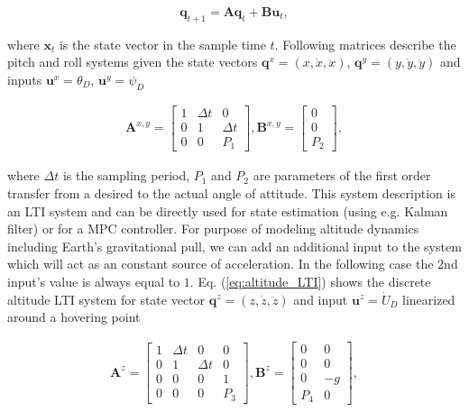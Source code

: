 \begin{equation}
\mathbf{q}_{t+1} = \mathbf{A}\mathbf{q}_{t}+ \mathbf{B}\mathbf{u}_{t},
\end{equation}

where $\mathbf{x}_{t}$ is the state vector in the sample time $t$. Following matrices describe the pitch and roll systems given the state vectors $\mathbf{q}^{x} = \left(x, \dot{x}, \ddot{x}\right)$, $\mathbf{q}^{y} = \left(y, \dot{y}, \ddot{y}\right)$ and inputs $\mathbf{u}^x = \theta_D$, $\mathbf{u}^y = \psi_D$

\begin{equation}
\begin{split}
\mathbf{A}^{x, y} = \begin{bmatrix}
1 & \Delta t & 0 \\
0 & 1 & \Delta t \\
0 & 0 & P_1
\end{bmatrix}, \mathbf{B}^{x, y} = \begin{bmatrix}
0\\
0\\
P_2
\end{bmatrix},
\end{split}
\end{equation}

where $\Delta t$ is the sampling period, $P_1$ and $P_2$ are parameters of the first order transfer from a desired to the actual angle of attitude. This system description is an LTI system and can be directly used for state estimation (using e.g. Kalman filter) or for a MPC controller. For purpose of modeling altitude dynamics including Earth's gravitational pull, we can add an additional input to the system which will act as an constant source of acceleration. In the following case the 2nd input's value is always equal to $1$. Eq. (\ref{eq:altitude_LTI}) shows the discrete altitude LTI system for state vector $\mathbf{q}^{z} = \left(z, \dot{z}, \ddot{z}\right)$ and input $\mathbf{u}^z = \dot{U}_D$ linearized around a hovering point

\begin{equation}
\begin{split}
\mathbf{A}^{z} = \begin{bmatrix}
1 & \Delta t & 0 & 0\\
0 & 1 & \Delta t & 0\\
0 & 0 & 0 & 1 \\
0 & 0 & 0 & P_3
\end{bmatrix}, \mathbf{B}^{z} = \begin{bmatrix}
0 & 0\\
0 & 0\\
0 & -g\\
P_4 & 0
\end{bmatrix},
\end{split}
\label{eq:altitude_LTI}
\end{equation}

